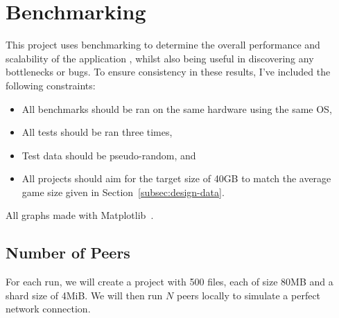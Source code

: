 
\newpage
\section{Benchmarking}\label{sec:benchmark}

This project uses benchmarking to determine the overall performance and scalability of the application , whilst also being useful in discovering any bottlenecks or bugs.
\x
To ensure consistency in these results, I've included the following constraints:

\begin{itemize}
  \item All benchmarks should be ran on the same hardware using the same OS,
  \item All tests should be ran three times,
  \item Test data should be pseudo-random, and
  \item All projects should aim for the target size of 40GB to match the average game size given in Section~\ref{subsec:design-data}.
\end{itemize}

\newparagraph
All graphs made with Matplotlib~\cite{}.

\subsection*{Number of Peers}

For each run, we will create a project with 500 files, each of size 80MB and a shard size of 4MiB. We will then run $N$ peers locally to simulate a perfect network connection.

